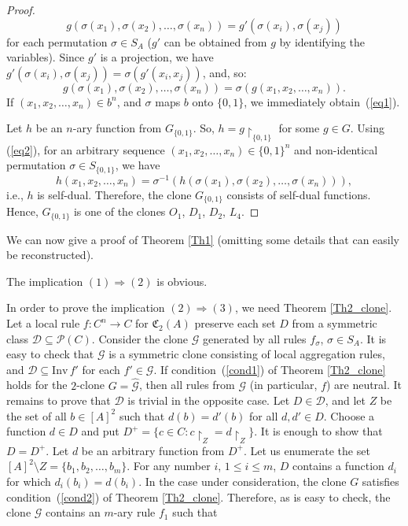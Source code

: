 \documentclass[graybox]{SNmult}
\theoremstyle{definition}
\begin{document}
\begin{proof}
	$$g(\sigma(x_1), \sigma(x_2), \ldots, \sigma(x_n))=g'(\sigma(x_i), \sigma(x_j))$$ for each permutation $\sigma\in S_A$ ($g'$ can be obtained from $g$ by identifying the variables). Since $g'$ is a projection, we have $g'(\sigma(x_i), \sigma(x_j))=\sigma(g'(x_i, x_j))$, and, so:
	\begin{equation}\label{eq2}
		g(\sigma(x_1), \sigma(x_2), \ldots, \sigma(x_n))=\sigma(g(x_1, x_2, \ldots, x_n)).
	\end{equation}
	If $(x_1, x_2, \ldots, x_n)\in b^n$, and $\sigma$ maps $b$ onto $\{0,1\}$, we immediately obtain~(\ref{eq1}). \par Let $h$ be an $n$-ary function from $G_{\{0,1\}}$. So, $h=g\restriction_{\{0,1\}}$ for some $g\in G$. Using (\ref{eq2}), for an arbitrary 
	sequence $(x_1, x_2, \ldots, x_n)\in \{0,1\}^n$ and non-identical permutation $\sigma\in S_{\{0,1\}}$, we have
	$$
	h(x_1, x_2, \ldots, x_n)=\sigma^{-1}(h(\sigma(x_1), \sigma(x_2), \ldots, \sigma(x_n))),
	$$
	i.e., $h$ is self-dual. Therefore, the clone $G_{\{0,1\}}$ consists of self-dual functions. Hence, $G_{\{0,1\}}$ is one of the clones $O_1$, $D_1$, $D_2$, $L_4$. 
\end{proof}
We can now give a proof of Theorem \ref{Th1} (omitting some details that can easily be reconstructed). 
\par The implication $(1)\Rightarrow (2)$ is obvious. 
\par In order to prove the implication $(2)\Rightarrow (3)$, we need Theorem \ref{Th2_clone}.  Let a local rule $f:C^n\to C$ for $\mathfrak C_2(A)$ preserve each set $D$ from a symmetric class $\mathscr D\subseteq \mathscr P(C)$. Consider the clone $\mathcal G$ generated by all rules $f_\sigma$, $\sigma\in S_A$. It is easy to check that $\mathcal G$ is a symmetric clone consisting of local aggregation rules, and $\mathscr D\subseteq \mathrm{Inv}\, f'$ for each $f'\in \mathcal G$. If condition~(\ref{cond1}) of Theorem \ref{Th2_clone} holds for the $2$-clone $G=\widehat{\mathcal G}$, then all rules from $\mathcal G$ (in particular, $f$) are neutral. It remains to prove that $\mathscr D$ is trivial in the opposite case. Let $D\in \mathscr D$, and let $Z$ be the set of all $b\in [A]^2$ such that $d(b)=d'(b)$ for all $d, d'\in D$. Choose a function $d\in D$ and put $D^+=\{c\in C: c\restriction_Z=d\restriction_Z\}$. It is enough to show that $D=D^+$. Let $d$ be an arbitrary function from $D^+$. Let us enumerate the set $[A]^2\setminus Z=\{b_1, b_2, \ldots, b_m\}$. For any number $i$, $1\leq i\leq m$, $D$ contains a function $d_i$ for which $d_i(b_i)=d(b_i)$. In the case under consideration, the clone $G$ satisfies condition~(\ref{cond2}) of Theorem \ref{Th2_clone}. Therefore, as is easy to check, the clone $\mathcal G$ contains an $m$-ary rule $f_1$ such that
\end{document}
